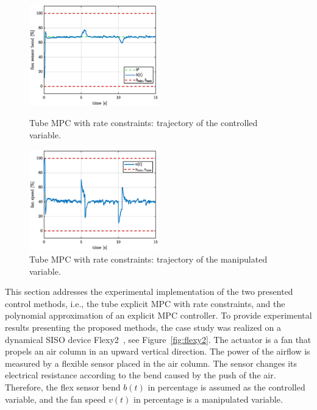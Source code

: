 \documentclass[letterpaper, 10 pt, conference]{ieeeconf}
\begin{document}
	
	\begin{figure}[hbp!]
		\begin{center}
			\includegraphics[width=0.5\textwidth]{images/deltaU_b_new.eps}
			\caption{Tube MPC with rate constraints: trajectory of the controlled variable.}
			\label{fig:deltaU_y}
		\end{center}
		\begin{center}
			\includegraphics[width=0.5\textwidth]{images/deltaU_v_new.eps}
			\caption{Tube MPC with rate constraints: trajectory of the manipulated variable.}
			\label{fig:deltaU_u}
		\end{center}
	\end{figure}
	
	This section addresses the experimental implementation of the two presented control methods, i.e., the tube explicit MPC with rate constraints, and the polynomial approximation of an explicit MPC controller. To provide experimental results presenting the proposed methods, the case study was realized on a dynamical SISO device Flexy2~\cite{flexy2}, see Figure~\ref{fig:flexy2}. The actuator is a fan that propels an air column in an upward vertical direction. The power of the airflow is measured
	by a flexible sensor placed in the air column. The sensor changes its electrical resistance according to the bend caused by the push of the air. Therefore, the flex sensor bend $b(t)$ in percentage is assumed as the controlled variable, and the fan speed $v(t)$ in percentage is a manipulated variable.
	
\end{document}

